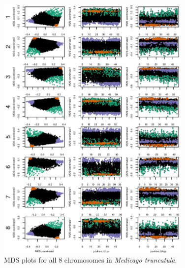 \documentclass[11pt, oneside]{article}   	%
\begin{document}
\begin{figure}
    \begin{center}
       \includegraphics[width=0.85\textwidth]{FigS_Together_MDS_plot_allchr}
    \end{center}
    \caption{
        MDS plots for all 8 chromosomes in \textit{Medicago truncatula}.
        \label{fig:mds_medicago_allchr}
    }
\end{figure}
\end{document}
